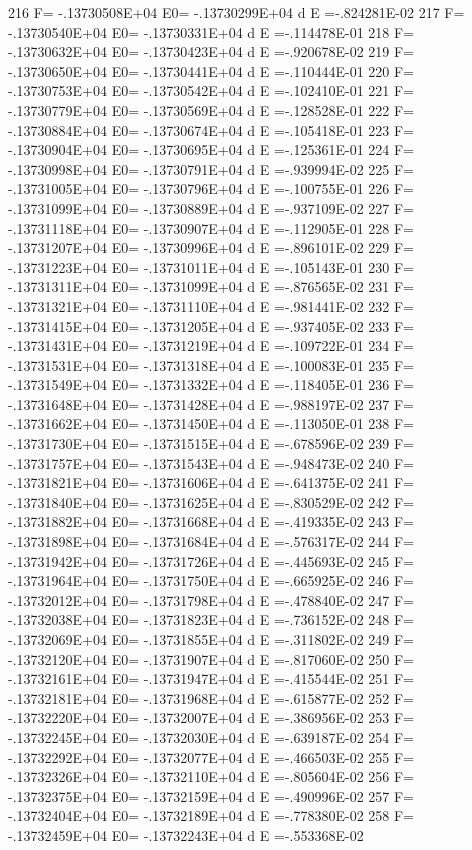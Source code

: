  216 F= -.13730508E+04 E0= -.13730299E+04  d E =-.824281E-02
 217 F= -.13730540E+04 E0= -.13730331E+04  d E =-.114478E-01
 218 F= -.13730632E+04 E0= -.13730423E+04  d E =-.920678E-02
 219 F= -.13730650E+04 E0= -.13730441E+04  d E =-.110444E-01
 220 F= -.13730753E+04 E0= -.13730542E+04  d E =-.102410E-01
 221 F= -.13730779E+04 E0= -.13730569E+04  d E =-.128528E-01
 222 F= -.13730884E+04 E0= -.13730674E+04  d E =-.105418E-01
 223 F= -.13730904E+04 E0= -.13730695E+04  d E =-.125361E-01
 224 F= -.13730998E+04 E0= -.13730791E+04  d E =-.939994E-02
 225 F= -.13731005E+04 E0= -.13730796E+04  d E =-.100755E-01
 226 F= -.13731099E+04 E0= -.13730889E+04  d E =-.937109E-02
 227 F= -.13731118E+04 E0= -.13730907E+04  d E =-.112905E-01
 228 F= -.13731207E+04 E0= -.13730996E+04  d E =-.896101E-02
 229 F= -.13731223E+04 E0= -.13731011E+04  d E =-.105143E-01
 230 F= -.13731311E+04 E0= -.13731099E+04  d E =-.876565E-02
 231 F= -.13731321E+04 E0= -.13731110E+04  d E =-.981441E-02
 232 F= -.13731415E+04 E0= -.13731205E+04  d E =-.937405E-02
 233 F= -.13731431E+04 E0= -.13731219E+04  d E =-.109722E-01
 234 F= -.13731531E+04 E0= -.13731318E+04  d E =-.100083E-01
 235 F= -.13731549E+04 E0= -.13731332E+04  d E =-.118405E-01
 236 F= -.13731648E+04 E0= -.13731428E+04  d E =-.988197E-02
 237 F= -.13731662E+04 E0= -.13731450E+04  d E =-.113050E-01
 238 F= -.13731730E+04 E0= -.13731515E+04  d E =-.678596E-02
 239 F= -.13731757E+04 E0= -.13731543E+04  d E =-.948473E-02
 240 F= -.13731821E+04 E0= -.13731606E+04  d E =-.641375E-02
 241 F= -.13731840E+04 E0= -.13731625E+04  d E =-.830529E-02
 242 F= -.13731882E+04 E0= -.13731668E+04  d E =-.419335E-02
 243 F= -.13731898E+04 E0= -.13731684E+04  d E =-.576317E-02
 244 F= -.13731942E+04 E0= -.13731726E+04  d E =-.445693E-02
 245 F= -.13731964E+04 E0= -.13731750E+04  d E =-.665925E-02
 246 F= -.13732012E+04 E0= -.13731798E+04  d E =-.478840E-02
 247 F= -.13732038E+04 E0= -.13731823E+04  d E =-.736152E-02
 248 F= -.13732069E+04 E0= -.13731855E+04  d E =-.311802E-02
 249 F= -.13732120E+04 E0= -.13731907E+04  d E =-.817060E-02
 250 F= -.13732161E+04 E0= -.13731947E+04  d E =-.415544E-02
 251 F= -.13732181E+04 E0= -.13731968E+04  d E =-.615877E-02
 252 F= -.13732220E+04 E0= -.13732007E+04  d E =-.386956E-02
 253 F= -.13732245E+04 E0= -.13732030E+04  d E =-.639187E-02
 254 F= -.13732292E+04 E0= -.13732077E+04  d E =-.466503E-02
 255 F= -.13732326E+04 E0= -.13732110E+04  d E =-.805604E-02
 256 F= -.13732375E+04 E0= -.13732159E+04  d E =-.490996E-02
 257 F= -.13732404E+04 E0= -.13732189E+04  d E =-.778380E-02
 258 F= -.13732459E+04 E0= -.13732243E+04  d E =-.553368E-02
